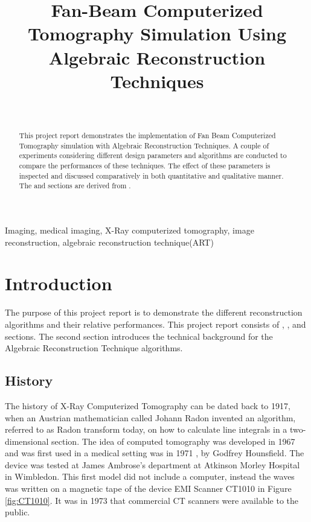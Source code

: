 \documentclass[journal]{IEEEtran}
\title{Fan-Beam Computerized Tomography Simulation Using Algebraic Reconstruction Techniques}
\author{
    \IEEEauthorblockN{Kutay Ugurlu} \\
    \IEEEauthorblockA{Middle East Technical University
    \\{kutay.ugurlu}@metu.com}
}
\begin{document}

\maketitle

\begin{abstract}This project report demonstrates the implementation of Fan Beam Computerized Tomography simulation with Algebraic Reconstruction Techniques. A couple of experiments considering different design parameters and algorithms are conducted to compare the performances of these techniques. The effect of these parameters is inspected and discussed comparatively in both quantitative and qualitative manner. The  and  sections are derived from \cite*{ugurlu2022}.
\end{abstract}
\begin{IEEEkeywords}
	Imaging, medical imaging, X-Ray computerized tomography, image reconstruction, algebraic reconstruction technique(ART)
\end{IEEEkeywords}

\section{Introduction} \label{sec:intro}
The purpose of this project report is to demonstrate the different reconstruction algorithms and their relative performances. This project report consists of , ,  and  sections. The second section introduces the technical background for the Algebraic Reconstruction Technique algorithms.  

\subsection{History}
The history of X-Ray Computerized Tomography can be dated back to 1917, when an Austrian mathematician called Johann Radon invented an algorithm, referred to as Radon transform today, on how to calculate line integrals in a two-dimensional section. The idea of computed tomography was developed in 1967 and was first used in a medical setting was in 1971 \cite{richmond2004sir}, by Godfrey Hounsfield. The device was tested at
James Ambrose’s department at Atkinson Morley Hospital in Wimbledon. This first model did not include a computer, instead the waves was written on a magnetic tape of the device EMI Scanner CT1010 in Figure \ref{fig:CT1010}. It was in 1973 that commercial CT scanners were available to the public. \cite{CTHist}
\end{document}

